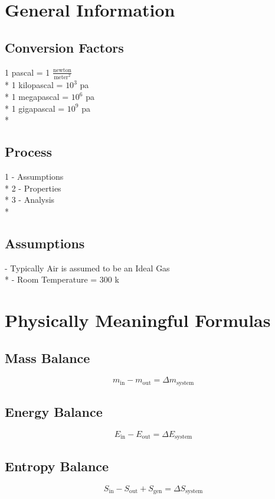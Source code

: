 \documentclass[10pt,landscape]{article}
\begin{document}
\begin{multicols}{3}
\section{General Information}
\subsection{Conversion Factors}
1 pascal        = 1 $\frac{\text{newton}}{\text{meter}^2}$\\*
1 kilopascal    = $10^3$ pa\\*
1 megapascal    = $10^6$ pa\\*
1 gigapascal    = $10^9$ pa\\*
\subsection{Process}
1 - Assumptions\\*
2 - Properties\\*
3 - Analysis\\*
\subsection{Assumptions}
- Typically Air is assumed to be an Ideal Gas\\*
- Room Temperature = 300 k

\section{Physically Meaningful Formulas}
\subsection{Mass Balance}
\begin{equation}
    m_\text{in}-m_\text{out}=\Delta m_\text{system}
\end{equation}
\subsection{Energy Balance}
\begin{equation}
    E_\text{in}-E_\text{out}=\Delta E_\text{system}
\end{equation}
\subsection{Entropy Balance}
\begin{equation}
    S_\text{in}-S_\text{out}+S_\text{gen}=\Delta S_\text{system}
\end{equation}

\end{multicols}
\end{document}
